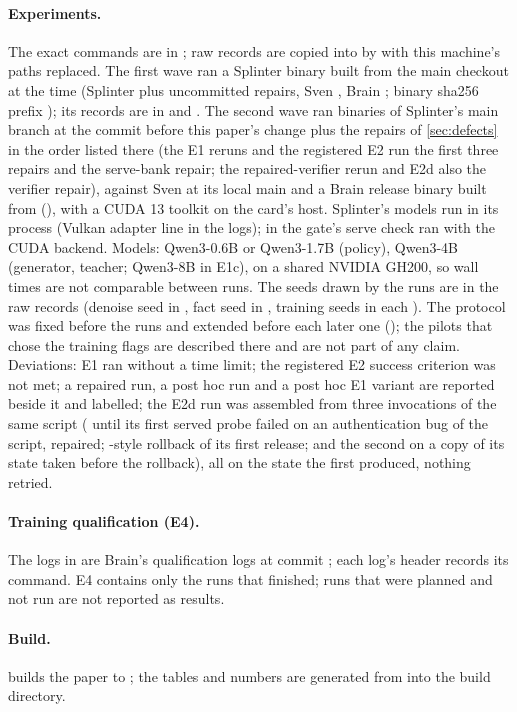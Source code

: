 \paragraph{Experiments.} The exact commands are in ; raw records
are copied into  by  with this machine's paths replaced.
The first wave ran a Splinter binary built from the main checkout at the time (Splinter
 plus uncommitted repairs, Sven , Brain ; binary sha256
prefix ); its records are in  and . The second wave
ran binaries of Splinter's main branch at the commit before this paper's change plus the repairs of
\cref{sec:defects} in the order listed there (the E1 reruns and the registered E2 run the first three
repairs and the serve-bank repair; the repaired-verifier rerun and E2d also the verifier repair), against Sven
at its local main  and a Brain release binary built from 
(), with a CUDA 13 toolkit on the card's host. Splinter's models run in its process
(Vulkan adapter line in the logs);  in the gate's serve check ran with the CUDA backend.
Models: Qwen3-0.6B or Qwen3-1.7B (policy), Qwen3-4B (generator, teacher; Qwen3-8B in E1c), on a shared NVIDIA GH200, so wall times are not
comparable between runs. The seeds drawn by the runs are in the raw records (denoise seed in
, fact seed in , training seeds in each ). The protocol was
fixed before the runs and extended before each later one (); the pilots that chose the
training flags are described there and are not part of any claim. Deviations: E1 ran without a time limit; the registered E2 success
criterion was not met; a repaired run, a post hoc run and a post hoc E1 variant are reported beside it and labelled;
the E2d run was assembled from three invocations of the same script
( until its first served probe failed on an authentication bug of the script, repaired; -style
rollback of its first release; and the second  on a copy of its state taken before the rollback), all on the state
the first produced, nothing retried.

\paragraph{Training qualification (E4).} The logs in  are Brain's
qualification logs at commit \mEFourCommit{}; each log's header records its command.
E4 contains only the runs that finished; runs that were planned and not run are not
reported as results.

\paragraph{Build.}  builds the paper to
; the tables and numbers are generated from  into the
build directory.
